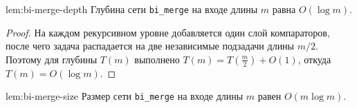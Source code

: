\begin{Lemma}{}{lem:bi-merge-depth}
	Глубина сети \texttt{bi\_merge} на входе длины $m$ равна $O(\log m)$.
\end{Lemma}

\begin{proof}
	На каждом рекурсивном уровне добавляется один слой компараторов, после чего задача распадается на две независимые подзадачи длины $m/2$.
	Поэтому для глубины $T(m)$ выполнено $T(m)=T\!\left(\tfrac{m}{2}\right)+O(1)$, откуда $T(m)=O(\log m)$.
\end{proof}

\begin{Lemma}{}{lem:bi-merge-size}
	Размер сети \texttt{bi\_merge} на входе длины $m$ равен $O(m\log m)$.
\end{Lemma}

